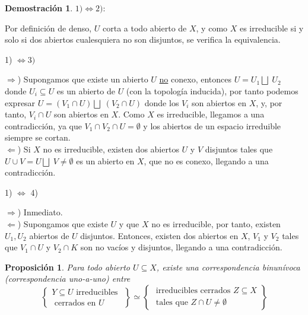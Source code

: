\documentclass[12pt,twoside]{report}
\theoremstyle{azul}
\newtheorem*{propx}{Proposición}
\theoremstyle{azul2}
\theoremstyle{plain}
\theoremstyle{definition}
\newtheorem*{demos}{Demostración}
\theoremstyle{remark}
\begin{document}
\begin{demos}

$1) \Leftrightarrow 2)$: 

Por definición de denso, $U$ corta a todo abierto de $X$, y como $X$ es irreducible si y solo si dos abiertos cualesquiera no son disjuntos, se verifica la equivalencia.

1) $\Leftrightarrow 3)$

$\Rightarrow$) Supongamos que existe un abierto $U$ \underline{no} conexo, entonces $U = U_1 \bigsqcup \; U_2$ donde $U_i \subseteq U$ es un abierto de $U$ (con la topología inducida), por tanto podemos expresar $U=(V_1 \cap U) \bigsqcup \; (V_2 \cap U)$ donde los $V_i$ son abiertos en $X$, y, por tanto, $V_i \cap U$ son abiertos en $X$. Como $X$ es irreducible, llegamos a una contradicción, ya que $V_1 \cap V_2 \cap U =\emptyset$ y los abiertos de un espacio irreduible siempre se cortan.\\
$\Leftarrow$) Si $X$ no es irreducible, existen dos abiertos $U$ y $V$ disjuntos tales que $U \cup V = U \bigsqcup \; V \neq \emptyset$ es un abierto en $X$, que no es conexo, llegando a una contradicción.

1) $\Leftrightarrow$ 4)

$\Rightarrow$) Inmediato. \\
$\Leftarrow$) Supongamos que existe $U$ y que $X$ no es irreducible, por tanto, existen $U_1, U_2$ abiertos de $U$ disjuntos. Entonces, existen dos abiertos en $X$, $V_1$ y $V_2$ tales que $V_1 \cap U$ y $V_2 \cap K$  son no vacíos y disjuntos, llegando a una contradicción.
\end{demos}
\begin{propx}
Para todo abierto $U \subseteq X$, existe una correspondencia binunívoca (correspondencia uno-a-uno) entre 
$$\left\{\begin{array}{c}
     Y \subseteq U \text{ irreducibles }  \\
     \text{ cerrados en } U 
\end{array}\right\} \simeq \left\{\begin{array}{c}
     \text{ irreducibles cerrados } Z \subseteq X \\
     \text{ tales que } Z \cap U \neq \emptyset 
\end{array}\right\}$$
\end{propx}
\end{document}
